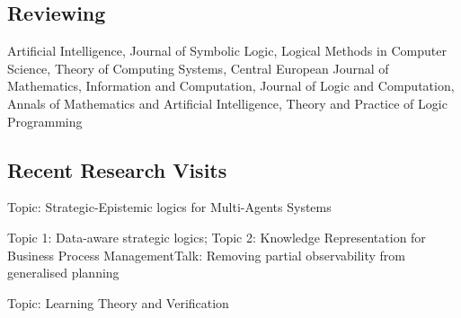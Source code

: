 \documentclass[10pt,a4paper,sans]{moderncv}
\begin{document}


\subsection{Reviewing}
{Artificial Intelligence, Journal of Symbolic Logic, Logical Methods in Computer Science, Theory of Computing Systems, Central European Journal of Mathematics, Information and Computation, Journal of Logic and Computation, Annals of Mathematics and Artificial Intelligence, Theory and Practice of Logic Programming}

\subsection{Recent Research Visits}


{Topic: Strategic-Epistemic logics for Multi-Agents Systems}{}{}{}

{Topic 1: Data-aware strategic logics;
Topic 2: Knowledge Representation for Business Process Management}{Talk: Removing partial observability from generalised planning}{}{}


{Topic: Learning Theory and Verification}{}{}{}
\end{document}

